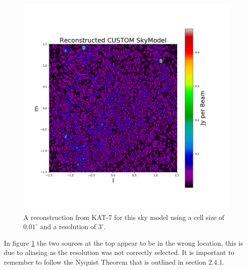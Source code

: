 \begin{figure}[H]
    \centering
    \includegraphics[scale=0.4]{images/RECON_KAT_7_4_POINT_ALIASING.png}
    \caption{A reconstruction from KAT-7 for this sky model using a cell size of $0.01^\circ$ and a resolution of $3^\circ$.}
    \label{fig:kat-7_recon_alias}
\end{figure}
In figure \ref{fig:kat-7_recon_alias} the two sources at the top appear to be in the wrong location, this is due to aliasing as the resolution was not correctly selected. It is important to remember to follow the Nyquist Theorem that is outlined in section 2.4.1.

